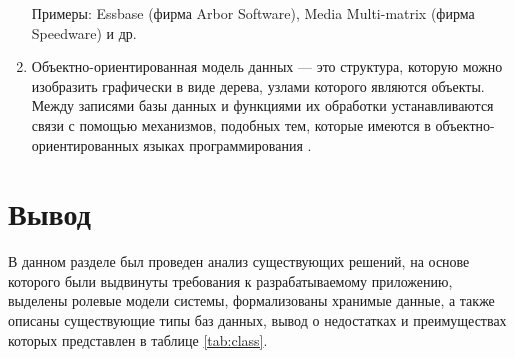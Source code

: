 \begin{enumerate}
	Примеры: Essbase (фирма Arbor Software), Media Multi-matrix (фирма Speedware) и др.
	
	\item Объектно-ориентированная модель данных --- это структура, которую можно изобразить графически в виде дерева, узлами которого являются объекты. Между записями базы данных и функциями их обработки устанавливаются связи с помощью механизмов, подобных тем, которые имеются в объектно-ориентированных языках программирования \cite{post}.
	
%	
	
\end{enumerate}

\section{Вывод}

В данном разделе был проведен анализ существующих решений, на основе которого были выдвинуты требования к разрабатываемому приложению, выделены ролевые модели системы, формализованы хранимые данные, а также описаны существующие типы баз данных, вывод о недостатках и преимуществах которых представлен в таблице \ref{tab:class}.

